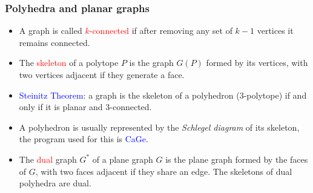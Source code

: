\documentclass{beamer}
\begin{document}
\begin{frame}\frametitle{Polyhedra and planar graphs}
\begin{itemize}
\item A graph is called \textcolor{red}{$k$-connected} if after removing any set
of $k-1$ vertices it remains connected.

\item 
The \textcolor{red}{skeleton} of a polytope $P$ is the graph 
$G(P)$ formed
by its vertices, with two vertices adjacent if they generate a face.

\item \textcolor{blue}{ Steinitz Theorem}: a  graph is the skeleton of a 
polyhedron ($3$-polytope) if and only if it is
planar and $3$-connected.

\item
A polyhedron  is usually  represented by the {\em Schlegel diagram} of its
skeleton, the program used
for this is \textcolor{blue}{CaGe}.
\item The \textcolor{red}{dual} graph $G^*$ of a plane graph $G$ is the plane
graph formed by the faces of $G$, with two faces adjacent if they share an edge.
The skeletons of dual polyhedra  are dual.

\end{itemize}

\end{frame}
\end{document}

